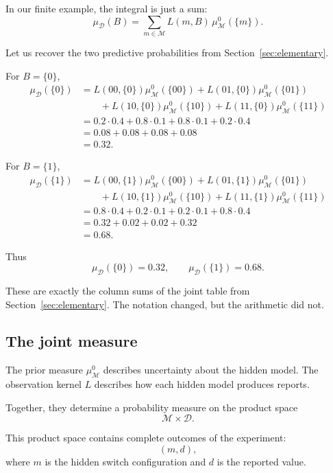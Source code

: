 \documentclass[11pt]{article}
\newcommand{\M}{\mathcal{M}}
\newcommand{\D}{\mathcal{D}}
\newcommand{\muMzero}{\mu^0_{\M}}
\newcommand{\muD}{\mu_{\D}}
\begin{document}
In our finite example, the integral is just a sum:
\[
    \muD(B)
    =
    \sum_{m\in\M} L(m,B)\,\muMzero(\{m\}).
\]

Let us recover the two predictive probabilities from Section~\ref{sec:elementary}.

For \(B=\{0\}\),
\[
\begin{aligned}
    \muD(\{0\})
    &=
    L(00,\{0\})\muMzero(\{00\})
    +
    L(01,\{0\})\muMzero(\{01\})
    \\
    &\qquad
    +
    L(10,\{0\})\muMzero(\{10\})
    +
    L(11,\{0\})\muMzero(\{11\})
    \\
    &=
    0.2\cdot 0.4
    +
    0.8\cdot 0.1
    +
    0.8\cdot 0.1
    +
    0.2\cdot 0.4
    \\
    &=
    0.08+0.08+0.08+0.08
    \\
    &=
    0.32.
\end{aligned}
\]

For \(B=\{1\}\),
\[
\begin{aligned}
    \muD(\{1\})
    &=
    L(00,\{1\})\muMzero(\{00\})
    +
    L(01,\{1\})\muMzero(\{01\})
    \\
    &\qquad
    +
    L(10,\{1\})\muMzero(\{10\})
    +
    L(11,\{1\})\muMzero(\{11\})
    \\
    &=
    0.8\cdot 0.4
    +
    0.2\cdot 0.1
    +
    0.2\cdot 0.1
    +
    0.8\cdot 0.4
    \\
    &=
    0.32+0.02+0.02+0.32
    \\
    &=
    0.68.
\end{aligned}
\]

Thus
\[
    \muD(\{0\})=0.32,
    \qquad
    \muD(\{1\})=0.68.
\]

These are exactly the column sums of the joint table from Section~\ref{sec:elementary}. The notation changed, but the arithmetic did not.

\subsection{The joint measure}

The prior measure \(\muMzero\) describes uncertainty about the hidden model. The observation kernel \(L\) describes how each hidden model produces reports.

Together, they determine a probability measure on the product space
\[
    \M\times\D.
\]

This product space contains complete outcomes of the experiment:
\[
    (m,d),
\]
where \(m\) is the hidden switch configuration and \(d\) is the reported value.
\end{document}
